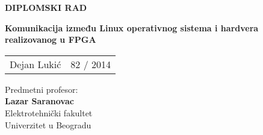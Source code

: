 	
\thispagestyle{empty}
\noindent
\noindent
\begin{center}
	\textup{\small {\bf DIPLOMSKI RAD}}\\[0.2in]
	\vspace{3in}

	
	
	\Large {\textbf {Komunikacija između Linux operativnog sistema i hardvera realizovanog u FPGA }}\\[2in]
	

	\vspace{1in}
	\begin{table}[h]
		\centering
		\begin{tabular}{lr}
			Dejan Lukić & 82 / 2014 \\
		\end{tabular}
	\end{table}
	
	\vspace{0.1in}
	Predmetni profesor:\\
	{\textbf{Lazar Saranovac}}\\

	\vspace{1in}	
		\Large{Elektrotehni\v cki fakultet}\\
	\normalsize
	Univerzitet u Beogradu \\
	

	
	\vfill
	
\end{center}

\pagebreak